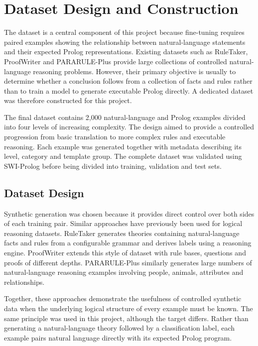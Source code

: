 \documentclass[11pt]{article} %
\theoremstyle{plain}
\theoremstyle{definition}
\begin{document}
\clearpage
\section{Dataset Design and Construction}

The dataset is a central component of this project because fine-tuning requires
paired examples showing the relationship between natural-language statements and
their expected Prolog representations. Existing datasets such as RuleTaker,
ProofWriter \cite{tafjord2021proofwriter} and PARARULE-Plus provide large collections of controlled
natural-language reasoning problems. However, their primary objective is usually
to determine whether a conclusion follows from a collection of facts and rules
rather than to train a model to generate executable Prolog directly. A dedicated
dataset was therefore constructed for this project.

The final dataset contains 2,000 natural-language and Prolog examples divided
into four levels of increasing complexity. The design aimed to provide a
controlled progression from basic translation to more complex rules and
executable reasoning. Each example was generated together with metadata
describing its level, category and template group. The complete dataset was
validated using SWI-Prolog before being divided into training, validation and
test sets.

\subsection{Dataset Design}

Synthetic generation was chosen because it provides direct control over both
sides of each training pair. Similar approaches have previously been used for
logical reasoning datasets. RuleTaker generates theories containing
natural-language facts and rules from a configurable grammar and derives labels
using a reasoning engine. ProofWriter \cite{tafjord2021proofwriter} extends this style of dataset with rule
bases, questions and proofs of different depths. PARARULE-Plus similarly
generates large numbers of natural-language reasoning examples involving people,
animals, attributes and relationships.

Together, these approaches demonstrate the usefulness of controlled synthetic
data when the underlying logical structure of every example must be known. The
same principle was used in this project, although the target differs. Rather
than generating a natural-language theory followed by a classification label,
each example pairs natural language directly with its expected Prolog program.
\end{document}
